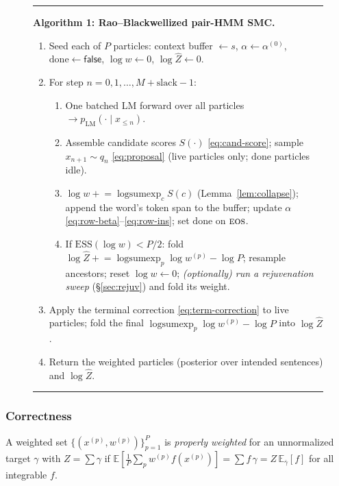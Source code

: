\documentclass[11pt]{article}
\providecommand{\given}{\mid}
\providecommand{\pLM}{p_{\mathrm{LM}}}
\providecommand{\eos}{\textsc{eos}}
\providecommand{\lse}{\operatorname{logsumexp}}
\begin{document}
\begin{figure}[t]
\hrule\vspace{3pt}
\textbf{Algorithm 1: Rao--Blackwellized pair-HMM SMC.}
\begin{enumerate}[leftmargin=2em,itemsep=1pt]
  \item Seed each of $P$ particles: context buffer $\gets s$, $\alpha \gets \alpha^{(0)}$,
        $\mathrm{done}\gets\textsf{false}$, $\log w \gets 0$, $\log\widehat Z\gets 0$.
  \item For step $n = 0,1,\dots,M+\text{slack}-1$:
  \begin{enumerate}[leftmargin=1.4em,itemsep=0pt]
    \item One batched LM forward over all particles $\to \pLM(\cdot\given x_{\le n})$.
    \item Assemble candidate scores $S(\cdot)$ \eqref{eq:cand-score}; sample $x_{n+1}\sim q_n$
          \eqref{eq:proposal} (live particles only; $\mathrm{done}$ particles idle).
    \item $\log w \mathrel{+}= \lse_c S(c)$ (Lemma~\ref{lem:collapse}); append the word's token span
          to the buffer; update $\alpha$ \eqref{eq:row-beta}--\eqref{eq:row-ins}; set
          $\mathrm{done}$ on $\eos$.
    \item If $\mathrm{ESS}(\log w) < P/2$: fold $\log\widehat Z\mathrel{+}= \lse_p\log w^{(p)} -\log P$;
          resample ancestors; reset $\log w\gets 0$;
          \emph{(optionally) run a rejuvenation sweep} (\S\ref{sec:rejuv}) and fold its weight.
  \end{enumerate}
  \item Apply the terminal correction \eqref{eq:term-correction} to live particles; fold the final
        $\lse_p\log w^{(p)}-\log P$ into $\log\widehat Z$.
  \item Return the weighted particles (posterior over intended sentences) and $\log\widehat Z$.
\end{enumerate}
\hrule
\label{alg:smc}
\end{figure}

\subsubsection{Correctness}

\begin{definition}
A weighted set $\{(x^{(p)}, w^{(p)})\}_{p=1}^P$ is \emph{properly weighted} for an unnormalized target $\gamma$ with $Z=\sum\gamma$ if $\mathbb E[\tfrac1P\sum_p w^{(p)} f(x^{(p)})] = \sum f\,\gamma = Z\,\mathbb E_{\bar\gamma}[f]$ for all integrable $f$.
\end{definition}
\end{document}
